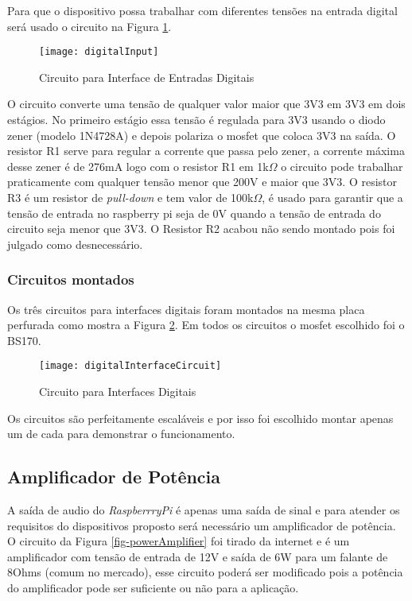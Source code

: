 		Para que o dispositivo possa trabalhar com diferentes tensões na entrada digital será usado o circuito na Figura \ref{fig-digitalInput}.

		\begin{figure}[htbp]
			\centering
				\texttt{[image: digitalInput]}
			\caption{Circuito para Interface de Entradas Digitais}
			\label{fig-digitalInput}
		\end{figure}
		
		O circuito converte uma tensão de qualquer valor maior que 3V3 em 3V3 em dois estágios. No primeiro estágio essa tensão é regulada para 3V3 usando o diodo zener (modelo 1N4728A) e depois polariza o mosfet que coloca 3V3 na saída. O resistor R1 serve para regular a corrente que passa pelo zener, a corrente máxima desse zener é de 276mA logo com o resistor R1 em 1k$\Omega$ o circuito pode trabalhar praticamente com qualquer tensão menor que 200V e maior que 3V3. O resistor R3 é um resistor de \textit{pull-down} e tem valor de 100k$\Omega$, é usado para garantir que a tensão de entrada no raspberry pi seja de 0V quando a tensão de entrada do circuito seja menor que 3V3. O Resistor R2 acabou não sendo montado pois foi julgado como desnecessário. 
		
	\subsubsection{Circuitos montados}
		Os três circuitos para interfaces digitais foram montados na mesma placa perfurada como mostra a Figura \ref{fig-digitalInterfaceCircuit}. Em todos os circuitos o mosfet escolhido foi o BS170.
		
		\begin{figure}[htbp]
			\centering
				\texttt{[image: digitalInterfaceCircuit]}
			\caption{Circuito para Interfaces Digitais}
			\label{fig-digitalInterfaceCircuit}
		\end{figure}
		
		Os circuitos são perfeitamente escaláveis e por isso foi escolhido montar apenas um de cada para demonstrar o funcionamento.
	
\subsection{Amplificador de Potência}

	A saída de audio do \textit{RaspberrryPi} é apenas uma saída de sinal e para atender os requisitos do dispositivos proposto será necessário um amplificador de potência. O circuito da Figura \ref{fig-powerAmplifier} foi tirado da internet \cite{powerAmplifier} e é um amplificador com tensão de entrada de 12V e saída de 6W para um falante de 8Ohms (comum no mercado), esse circuito poderá ser modificado pois a potência do amplificador pode ser suficiente ou não para a aplicação.

